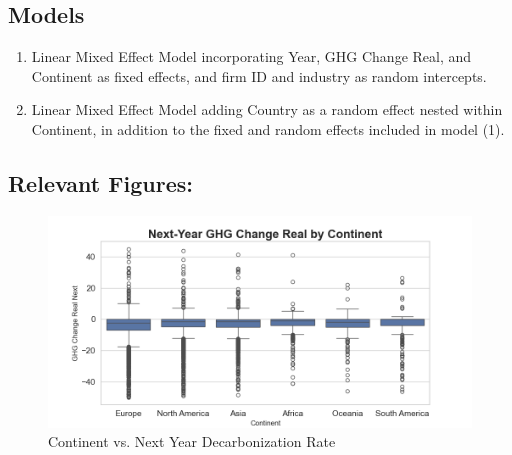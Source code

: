 \subsection{Models} 
\begin{enumerate}
    \item Linear Mixed Effect Model incorporating Year, GHG Change Real, and Continent as fixed effects, and firm ID and industry as random intercepts.
    \item Linear Mixed Effect Model adding Country as a random effect nested within Continent, in addition to the fixed and random effects included in model (1).
\end{enumerate}



\subsection{Relevant Figures:}

\begin{figure}[H]
\centering
  \includegraphics[width=\textwidth]{figures/ghg_change_real_next_by_continent.png}
\caption{Continent vs. Next Year Decarbonization Rate}
\label{fig:continent_vs_ghg_change_real_next}
\end{figure}

